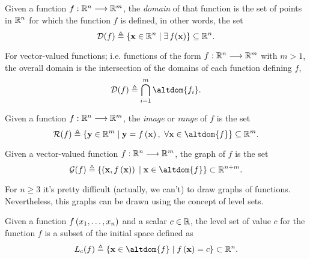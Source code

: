 
\begin{defn}[Domain]
Given a function $\stdvf$, the \textit{domain} of that function is the set of points in $\Rtn$ for which the function $f$ is 
defined, in other words, the set
\begin{equation}
\dom{f} \bydef \{\vec{x}\in\Rtn\st\exists f(\vec{x})\}\subseteq\Rtn.
\end{equation}
\end{defn}

\noindent For vector-valued functions; i.e. functions of the form $\stdvf$ with $m > 1$, the overall domain is the intersection of the
domains of each function defining $f$,
\begin{equation}
\dom{f}\bydef\bigcap_{i=1}^m\altdom{f_i}.
\end{equation}

\begin{defn}[Image]
Given a function $\stdvf$, the \textit{image} or \textit{range} of $f$ is the set
\begin{equation}
\image{f}\bydef\{\vec{y}\in\R^m\st \vec{y} = f\left(\vec{x}\right),\ \forall\vec{x}\in\altdom{f}\}\subseteq\R^m.
\end{equation}
\end{defn}

\begin{defn}[Graph]
Given a vector-valued function $\stdvf$, the graph of $f$ is the set
\begin{equation}
\fgraph{f}\bydef\{\left(\vec{x}, f\left(\vec{x}\right)\right)\st\vec{x}\in\altdom{f}\}\subset\R^{n + m}.
\end{equation}
\end{defn}

For $n\geq 3$ it's pretty difficult (actually, we can't) to draw graphs of functions. Nevertheless, this graphs
can be drawn using the concept of level sets.

\begin{defn}
Given a function $f\left(x_1, \ldots, x_n\right)$ and a scalar $c\in\R$, the level set of value $c$ for the function $f$ is a subset of the initial space
defined as
\begin{equation}
\levelset{c}{f} \bydef \{\vec{x}\in\altdom{f}\st f\left(\vec{x}\right) = c\}\subset\Rtn.
\end{equation}
\end{defn}

